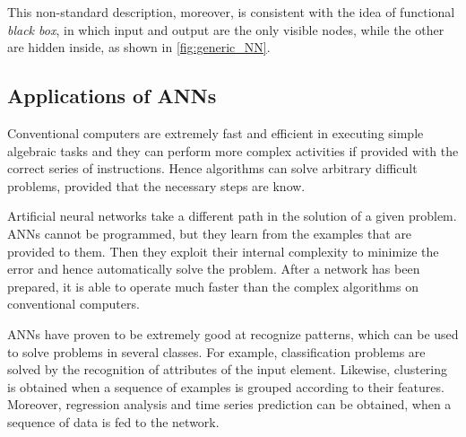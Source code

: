 This non-standard description, moreover, is consistent with the idea of functional \textit{black box}, in which input and output are the only visible nodes, while the other are hidden inside, as shown in \autoref{fig:generic_NN}.

\subsection{Applications of ANNs}
\label{ssec:Applications_of_ANNs}
Conventional computers are extremely fast and efficient in executing simple algebraic tasks and they can perform more complex activities if provided with the correct series of instructions.
Hence algorithms can solve arbitrary difficult problems, provided that the necessary steps are know.

Artificial neural networks take a different path in the solution of a given problem.
\acsp{ANN} cannot be programmed, but they learn from the examples that are provided to them.
Then they exploit their internal complexity to minimize the error and hence automatically solve the problem.
After a network has been prepared, it is able to operate much faster than the complex algorithms on conventional computers.

\acsp{ANN} have proven to be extremely good at recognize patterns, which can be used to solve problems in several classes.
For example, classification problems are solved by the recognition of attributes of the input element.
Likewise, clustering is obtained when a sequence of examples is grouped according to their features.
Moreover, regression analysis and time series prediction can be obtained, when a sequence of data is fed to the network.

